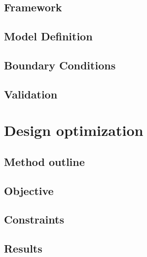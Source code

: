     \subsection{Framework}                      \label{Chapter:PMLSM design HM/electromagnetic model/framework}
    \subsection{Model Definition}               \label{Chapter:PMLSM design HM/electromagnetic model/model definition}
    \subsection{Boundary Conditions}            \label{Chapter:PMLSM design HM/electromagnetic model/Boundary conditions}
    \subsection{Validation}                     \label{Chapter:PMLSM design HM/electromagnetic model/Validation}


\section{Design optimization}                   \label{Chapter:PMLSM design HM/design optimization}
    \subsection{Method outline}                 \label{Chapter:PMLSM design HM/design optimization/method outline}
    \subsection{Objective}                      \label{Chapter:PMLSM design HM/design optimization/objectives}
    \subsection{Constraints}                    \label{Chapter:PMLSM design HM/design optimization/constraints}
    \subsection{Results}                        \label{Chapter:PMLSM design HM/design optimization/results}


